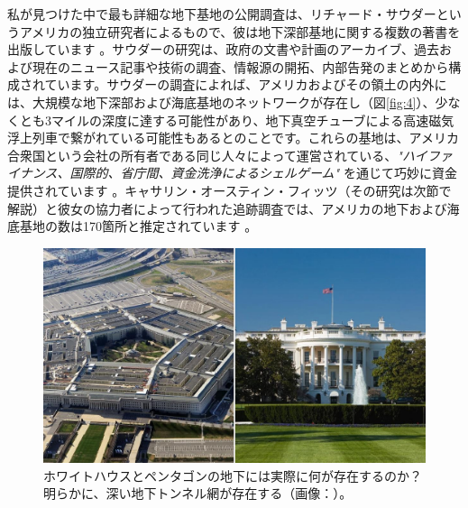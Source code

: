 \documentclass[10pt,twocolumn,letterpaper]{article}
\begin{document}
私が見つけた中で最も詳細な地下基地の公開調査は、リチャード・サウダーというアメリカの独立研究者によるもので、彼は地下深部基地に関する複数の著書を出版しています \cite{22}。サウダーの研究は、政府の文書や計画のアーカイブ、過去および現在のニュース記事や技術の調査、情報源の開拓、内部告発のまとめから構成されています。サウダーの調査によれば、アメリカおよびその領土の内外には、大規模な地下深部および海底基地のネットワークが存在し（図\ref{fig:4}）、少なくとも3マイルの深度に達する可能性があり、地下真空チューブによる高速磁気浮上列車で繋がれている可能性もあるとのことです。これらの基地は、アメリカ合衆国という会社の所有者である同じ人々によって運営されている、\textit{"ハイファイナンス、国際的、省庁間、資金洗浄によるシェルゲーム"} を通じて巧妙に資金提供されています \cite{22}。キャサリン・オースティン・フィッツ（その研究は次節で解説）と彼女の協力者によって行われた追跡調査では、アメリカの地下および海底基地の数は170箇所と推定されています \cite{16,20}。

\begin{figure}[b]
\begin{center}
   \includegraphics[width=1\linewidth]{penta.jpg}
\end{center}
   \caption{ホワイトハウスとペンタゴンの地下には実際に何が存在するのか？ 明らかに、深い地下トンネル網が存在する（画像：\cite{31}）。}
\label{fig:3}
\label{fig:onecol}
\end{figure}
\end{document}

